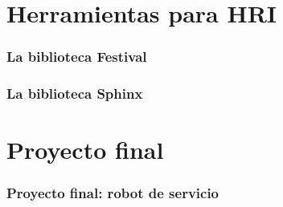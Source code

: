 \section{Herramientas para HRI}

\begin{frame}\frametitle{La biblioteca Festival}
\end{frame}

\begin{frame}\frametitle{La biblioteca Sphinx}
\end{frame}

\section{Proyecto final}

\begin{frame}\frametitle{Proyecto final: robot de servicio}
\end{frame}
